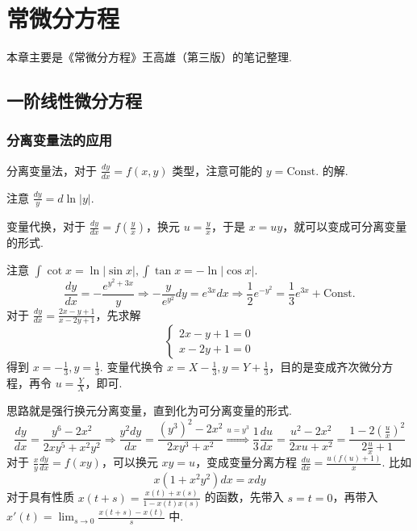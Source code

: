 \setchapterpreamble[u]{\margintoc}
\chapter{常微分方程}

本章主要是《常微分方程》王高雄（第三版）的笔记整理.

\section{一阶线性微分方程}

\subsection{分离变量法的应用}

分离变量法，对于 $\displaystyle \frac{dy}{dx}=f(x,y)$ 类型，注意可能的 $\displaystyle y=\text{Const.}$ 的解.

注意 $\displaystyle \frac{dy}{y}=d\ln \lvert y \rvert$.

变量代换，对于 $\displaystyle \frac{dy}{dx}=f\left( \frac{y}{x} \right)$，换元 $\displaystyle u=\frac{y}{x}$，于是 $\displaystyle x=uy$，就可以变成可分离变量的形式.

注意 $\displaystyle \int \cot x=\ln \lvert \sin x \rvert,\int \tan x=-\ln \lvert \cos x \rvert$.
$$
    \frac{dy}{dx}=-\frac{e^{ y^{2}+3x }}{y}\Rightarrow-\frac{y}{e^{ y^{2} }}dy=e^{ 3x }dx\Rightarrow\frac{1}{2}e^{ -y^{2} }=\frac{1}{3}e^{ 3x }+\text{Const.}
$$
对于 $\displaystyle \frac{dy}{dx}=\frac{2x-y+1}{x-2y+1}$，先求解
$$
    \left\{\begin{array}{l}
        2x-y+1=0 \\
        x-2y+1=0
    \end{array}\right.
$$
得到 $\displaystyle x=-\frac{1}{3},y=\frac{1}{3}$. 变量代换令 $\displaystyle x=X-\frac{1}{3},y=Y+\frac{1}{3}$，目的是变成齐次微分方程，再令 $\displaystyle u=\frac{Y}{X}$，即可.

思路就是强行换元分离变量，直到化为可分离变量的形式.
$$
    \frac{dy}{dx}=\frac{y^{6}-2x^{2}}{2xy^{5}+x^{2}y^{2}}\Rightarrow\frac{y^{2}dy}{dx}=\frac{(y^{3})^{2}-2x^{2}}{2xy^{3}+x^{2}}\overset{ u=y^{3} }{ \Rightarrow }\frac{1}{3}\frac{du}{dx}=\frac{u^{2}-2x^{2}}{2xu+x^{2}}=\frac{1-2\left( \frac{u}{x} \right)^{2}}{2\frac{u}{x}+1}
$$
对于 $\displaystyle \frac{x}{y}\frac{dy}{dx}=f(xy)$，可以换元 $\displaystyle xy=u$，变成变量分离方程 $\displaystyle \frac{du}{dx}=\frac{u(f(u)+1)}{x}$. 比如
$$
    x(1+x^{2}y^{2})dx=xdy
$$
对于具有性质 $\displaystyle x(t+s)=\frac{x(t)+x(s)}{1-x(t)x(s)}$ 的函数，先带入 $\displaystyle s=t=0$，再带入 $\displaystyle x'(t)=\lim_{ s \to 0 }\frac{x(t+s)-x(t)}{s}$ 中.


